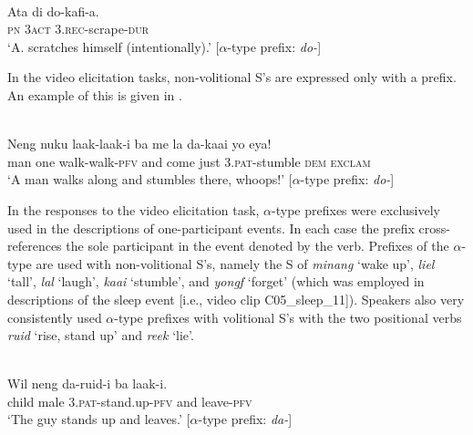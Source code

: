 \ea%
\label{bkm:Ref283207000}
 \\ 
\gll    Ata  di  do-kafi-a.\\  
      \textsc{pn} 3\textsc{act}  3.\textsc{rec}{}-scrape-\textsc{dur}\\
\glt  `A. scratches himself (intentionally).' [$\alpha $-type prefix: \textit{do-}]
\z







In the video elicitation tasks, non-volitional S's are expressed only with a prefix. An example of this is given in .


\ea%
\label{bkm:Ref383854029}
 \\ 
\gll    Neng  nuku  laak-laak-i  ba  me  la  da-kaai  yo  eya!\\  
    man  one  walk-walk-\textsc{pfv} and  come  just  3.\textsc{pat}{}-stumble  \textsc{dem} \textsc{exclam}\\
\glt  `A man walks along and stumbles there, whoops!' [$\alpha $-type prefix: \textit{do-}]
\z



 



In the responses to the video elicitation task, $\alpha $-type prefixes were exclusively used in the descriptions of one-participant events. In each case the prefix cross-references the sole participant in the event denoted by the verb. Prefixes of the $\alpha $-type are used with non-volitional S's, namely the S of \textit{minang} `wake up', \textit{liel} `tall', \textit{lal} `laugh', \textit{kaai} `stumble', and \textit{yongf} `forget' (which was employed in descriptions of the sleep event [i.e., video clip C05\_sleep\_11]). Speakers also very consistently used $\alpha $-type prefixes with volitional S's with the two positional verbs \textit{ruid} `rise, stand up' and \textit{reek} `lie'.


\ea 
{} \\ 
 \gll    Wil  neng  da-ruid-i  ba  laak-i.\\
    child  male  3.\textsc{pat}{}-stand.up-\textsc{pfv} and  leave-\textsc{pfv} \\
 \glt `The guy stands up and leaves.' [$\alpha $-type prefix: \textit{da-}]
\z





